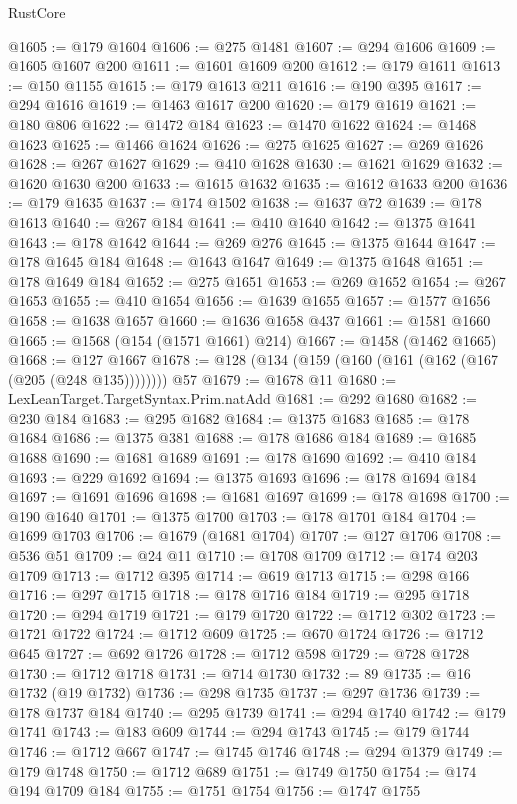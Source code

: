 \begin{lexlean}{RustCore}
\begin{coremodule}
@1605 := @179 @1604
@1606 := @275 @1481
@1607 := @294 @1606
@1609 := @1605 @1607 @200
@1611 := @1601 @1609 @200
@1612 := @179 @1611
@1613 := @150 @1155
@1615 := @179 @1613 @211
@1616 := @190 @395
@1617 := @294 @1616
@1619 := @1463 @1617 @200
@1620 := @179 @1619
@1621 := @180 @806
@1622 := @1472 @184
@1623 := @1470 @1622
@1624 := @1468 @1623
@1625 := @1466 @1624
@1626 := @275 @1625
@1627 := @269 @1626
@1628 := @267 @1627
@1629 := @410 @1628
@1630 := @1621 @1629
@1632 := @1620 @1630 @200
@1633 := @1615 @1632
@1635 := @1612 @1633 @200
@1636 := @179 @1635
@1637 := @174 @1502
@1638 := @1637 @72
@1639 := @178 @1613
@1640 := @267 @184
@1641 := @410 @1640
@1642 := @1375 @1641
@1643 := @178 @1642
@1644 := @269 @276
@1645 := @1375 @1644
@1647 := @178 @1645 @184
@1648 := @1643 @1647
@1649 := @1375 @1648
@1651 := @178 @1649 @184
@1652 := @275 @1651
@1653 := @269 @1652
@1654 := @267 @1653
@1655 := @410 @1654
@1656 := @1639 @1655
@1657 := @1577 @1656
@1658 := @1638 @1657
@1660 := @1636 @1658 @437
@1661 := @1581 @1660
@1665 := @1568 (@154 (@1571 @1661) @214)
@1667 := @1458 (@1462 @1665)
@1668 := @127 @1667
@1678 := @128 (@134 (@159 (@160 (@161 (@162 (@167 (@205 (@248 @135)))))))) @57
@1679 := @1678 @11
@1680 := LexLeanTarget.TargetSyntax.Prim.natAdd
@1681 := @292 @1680
@1682 := @230 @184
@1683 := @295 @1682
@1684 := @1375 @1683
@1685 := @178 @1684
@1686 := @1375 @381
@1688 := @178 @1686 @184
@1689 := @1685 @1688
@1690 := @1681 @1689
@1691 := @178 @1690
@1692 := @410 @184
@1693 := @229 @1692
@1694 := @1375 @1693
@1696 := @178 @1694 @184
@1697 := @1691 @1696
@1698 := @1681 @1697
@1699 := @178 @1698
@1700 := @190 @1640
@1701 := @1375 @1700
@1703 := @178 @1701 @184
@1704 := @1699 @1703
@1706 := @1679 (@1681 @1704)
@1707 := @127 @1706
@1708 := @536 @51
@1709 := @24 @11
@1710 := @1708 @1709
@1712 := @174 @203 @1709
@1713 := @1712 @395
@1714 := @619 @1713
@1715 := @298 @166
@1716 := @297 @1715
@1718 := @178 @1716 @184
@1719 := @295 @1718
@1720 := @294 @1719
@1721 := @179 @1720
@1722 := @1712 @302
@1723 := @1721 @1722
@1724 := @1712 @609
@1725 := @670 @1724
@1726 := @1712 @645
@1727 := @692 @1726
@1728 := @1712 @598
@1729 := @728 @1728
@1730 := @1712 @1718
@1731 := @714 @1730
@1732 := 89
@1735 := @16 @1732 (@19 @1732)
@1736 := @298 @1735
@1737 := @297 @1736
@1739 := @178 @1737 @184
@1740 := @295 @1739
@1741 := @294 @1740
@1742 := @179 @1741
@1743 := @183 @609
@1744 := @294 @1743
@1745 := @179 @1744
@1746 := @1712 @667
@1747 := @1745 @1746
@1748 := @294 @1379
@1749 := @179 @1748
@1750 := @1712 @689
@1751 := @1749 @1750
@1754 := @174 @194 @1709 @184
@1755 := @1751 @1754
@1756 := @1747 @1755

\end{coremodule}
\end{lexlean}
